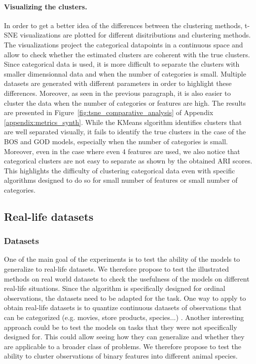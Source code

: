 \paragraph{Visualizing the clusters.}
In order to get a better idea of the differences between the clustering methods, t-SNE visualizations \citep{van2008visualizing} are plotted for different disitributions and clustering methods. The visualizations project the categorical datapoints in a continuous space and allow to check whether the estimated clusters are coherent with the true clusters. Since categorical data is used, it is more difficult to separate the clusters with smaller dimensionnal data and when the number of categories is small. Multiple datasets are generated with different parameters in order to highlight these differences. Moreover, as seen in the previous paragraph, it is also easier to cluster the data when the number of categories or features are high.
The results are presented in Figure~\ref{fig:tsne_comparative_analysis} of Appendix \ref{appendix:metrics_synth}. While the KMeans slgorithm identifies clusters that are well separated visually, 
it fails to identify the true clusters in the case of the BOS and GOD models, especially when the number of categories is small. Moreover, even in the case where even 4 features are used, we also notice that categorical clusters are not easy to separate as shown by the obtained ARI scores. This highlights the difficulty of clustering categorical data even with specific algorithms designed to do so for small number of features or small number of categories.

\subsection{Real-life datasets}
\subsubsection{Datasets} One of the main goal of the experiments is to test the ability of the models to generalize to real-life datasets. We therefore propose to test the illustrated methods on real world datasets to check the usefulness of the models on different real-life situations. Since the algorithm is specifically designed for ordinal observations, the datasets need to be adapted for the task. One way to apply to obtain real-life datasets is to quantize continuous datasets of observations that can be categorized (e.g. movies, store products, species...) \citep{skubacz2000quantization}. Another interesting approach could be to test the models on tasks that they were not specifically designed for. This could allow seeing how they can generalize and whether they are applicable to a broader class of problems. We therefore propose to test the ability to cluster observations of binary features into different animal species.
